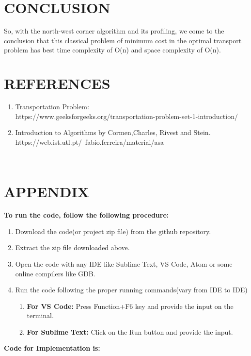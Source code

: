 \documentclass[10pt]{article}
\begin{document}
\begin{multicols*}{2}
\section*{CONCLUSION}

So, with the north-west corner algorithm and its profiling, we come to the conclusion that this classical problem of minimum cost in the optimal transport problem has best time complexity of O(n) and space complexity of O(n).

\section*{REFERENCES}

\begin{enumerate}
\item Transportation Problem:\\
https://www.geeksforgeeks.org/transportation-problem-set-1-introduction/
\item Introduction to Algorithms by Cormen,Charles, Rivest and Stein.\\
https://web.ist.utl.pt/~fabio.ferreira/material/asa
\end{enumerate}\\

\newpage
\section*{APPENDIX}
\textbf{To run the code, follow the following procedure:}
\begin{enumerate}
    \item Download the code(or project zip file) from the github repository.
    \item Extract the zip file downloaded above.
    \item Open the code with any IDE like Sublime Text, VS Code, Atom or some online compilers like GDB.
    \item Run the code following the proper running commands(vary from IDE to IDE)
    \begin{enumerate}
        \item \textbf{For VS Code:} Press Function+F6 key and provide the input on the terminal.
        \item \textbf{For Sublime Text:} Click on the Run button and provide the input.\\
    \end{enumerate}
\end{enumerate}
\textbf{Code for Implementation is:}


\end{multicols*}
\end{document}
